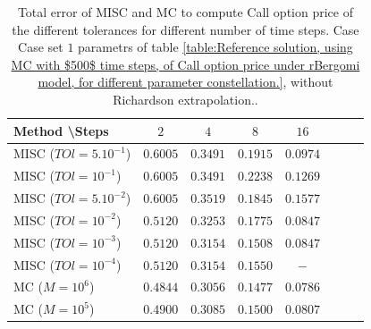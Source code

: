 \documentclass[11pt]{article}
\begin{document}
\begin{table}[h!]
	\centering
	\begin{tabular}{l*{6}{c}r}
		Method \textbackslash  Steps            & $2$ & $4$ & $8$ & $16$  \\
		\hline
		MISC ($TOl=5.10^{-1}$)  & $\mathbf{0.6005}$ & $\mathbf{0.3491}$ & $\mathbf{ 0.1915}$ & $\mathbf{ 0.0974}$  \\
		MISC ($TOl=10^{-1}$)  & $\mathbf{ 0.6005}$ & $\mathbf{ 0.3491}$ & $\mathbf{  0.2238}$ & $\mathbf{
			0.1269}$  \\
		MISC ($TOl=5.10^{-2}$)  &$\mathbf{0.6005}$ & $\mathbf{  0.3519}$ & $\mathbf{ 0.1845}$ & $\mathbf{  0.1577}$  \\
		MISC ($TOl=10^{-2}$)  & $\mathbf{0.5120}$ & $\mathbf{0.3253}$ & $\mathbf{ 0.1775}$ & $\mathbf{  0.0847}$  \\
		MISC ($TOl=10^{-3}$)  & $\mathbf{0.5120}$ & $\mathbf{0.3154}$ & $\mathbf{0.1508}$ & $\mathbf{0.0847}$  \\
		MISC ($TOl=10^{-4}$)  & $\mathbf{0.5120}$ & $\mathbf{0.3154}$ & $\mathbf{0.1550}$ & $\mathbf{-}$  \\
		\hline
		MC  ($M=10^6$)   & $\mathbf{
			0.4844}$  & $\mathbf{    0.3056
		}$  & $\mathbf{0.1477
		}$ & $\mathbf{0.0786
		}$  \\	
		
		MC  ($M=10^5$)   & $\mathbf{
			0.4900}$  & $\mathbf{  0.3085 
		}$  & $\mathbf{0.1500
		}$ & $\mathbf{0.0807
		}$  \\			
		
		\hline
	\end{tabular}
	\caption{Total error of MISC and MC to compute Call option price of the different tolerances for different number of time steps. Case Case set $1$ parametrs of table \ref{table:Reference solution, using MC with $500$ time steps, of Call option price under rBergomi model, for different parameter constellation.}, without Richardson extrapolation..}
	\label{Total error of MISC and MC to compute Call option price of the different tolerances for different number of time steps. Case set 1, without Richardson extrapolation. The numbers between parentheses are the corresponding absolute errors.}
\end{table}
\end{document}
